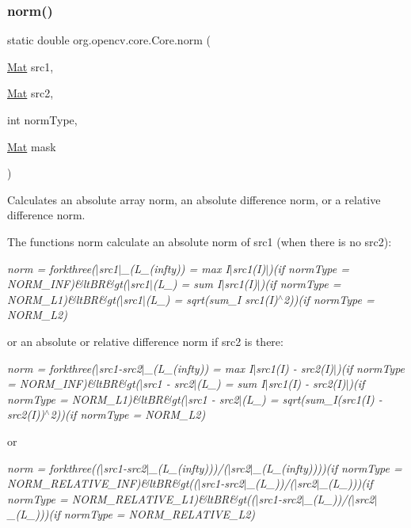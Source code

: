 \subsubsection{\texorpdfstring{norm()}{norm()}\hspace{0.1cm}{\footnotesize\ttfamily [4/6]}}
{\footnotesize\ttfamily static double org.\+opencv.\+core.\+Core.\+norm (\begin{DoxyParamCaption}\item[{\mbox{\hyperlink{classorg_1_1opencv_1_1core_1_1_mat}{Mat}}}]{src1,  }\item[{\mbox{\hyperlink{classorg_1_1opencv_1_1core_1_1_mat}{Mat}}}]{src2,  }\item[{int}]{norm\+Type,  }\item[{\mbox{\hyperlink{classorg_1_1opencv_1_1core_1_1_mat}{Mat}}}]{mask }\end{DoxyParamCaption})\hspace{0.3cm}{\ttfamily [static]}}

Calculates an absolute array norm, an absolute difference norm, or a relative difference norm.

The functions {\ttfamily norm} calculate an absolute norm of {\ttfamily src1} (when there is no {\ttfamily src2})\+:

{\itshape norm = forkthree($\vert$src1$\vert$\+\_\+(L\+\_\+(infty)) = max {\itshape I$\vert$src1(I)$\vert$)(if norm\+Type = N\+O\+R\+M\+\_\+\+I\+NF)\&lt\+BR\&gt($\vert$src1$\vert$}(L\+\_) = sum {\itshape I$\vert$src1(I)$\vert$)(if norm\+Type = N\+O\+R\+M\+\_\+\+L1)\&lt\+BR\&gt($\vert$src1$\vert$}(L\+\_) = sqrt(sum\+\_\+\+I src1(\+I)$^\wedge$2))(if norm\+Type = N\+O\+R\+M\+\_\+\+L2)}

or an absolute or relative difference norm if {\ttfamily src2} is there\+:

{\itshape norm = forkthree($\vert$src1-\/src2$\vert$\+\_\+(L\+\_\+(infty)) = max {\itshape I$\vert$src1(I) -\/ src2(\+I)$\vert$)(if norm\+Type = N\+O\+R\+M\+\_\+\+I\+NF)\&lt\+BR\&gt($\vert$src1 -\/ src2$\vert$}(L\+\_) = sum {\itshape I$\vert$src1(I) -\/ src2(\+I)$\vert$)(if norm\+Type = N\+O\+R\+M\+\_\+\+L1)\&lt\+BR\&gt($\vert$src1 -\/ src2$\vert$}(L\+\_) = sqrt(sum\+\_\+I(src1(\+I) -\/ src2(\+I))$^\wedge$2))(if norm\+Type = N\+O\+R\+M\+\_\+\+L2)}

or

{\itshape norm = forkthree(($\vert$src1-\/src2$\vert$\+\_\+(L\+\_\+(infty)))/($\vert$src2$\vert$\+\_\+(L\+\_\+(infty))))(if norm\+Type = N\+O\+R\+M\+\_\+\+R\+E\+L\+A\+T\+I\+V\+E\+\_\+\+I\+NF)\&lt\+BR\&gt(($\vert$src1-\/src2$\vert$\+\_\+(L\+\_))/($\vert$src2$\vert$\+\_\+(L\+\_)))(if norm\+Type = N\+O\+R\+M\+\_\+\+R\+E\+L\+A\+T\+I\+V\+E\+\_\+\+L1)\&lt\+BR\&gt(($\vert$src1-\/src2$\vert$\+\_\+(L\+\_))/($\vert$src2$\vert$\+\_\+(L\+\_)))(if norm\+Type = N\+O\+R\+M\+\_\+\+R\+E\+L\+A\+T\+I\+V\+E\+\_\+\+L2)}

